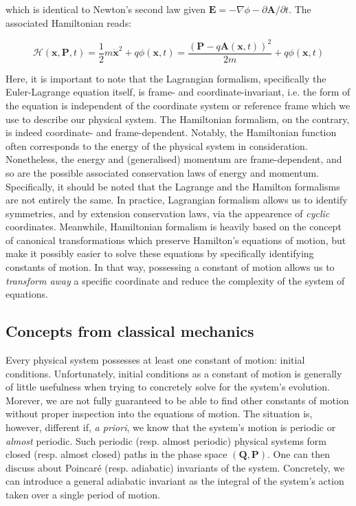which is identical to Newton's second law given $\mathbf{E}=-\nabla \phi-\partial \mathbf{A}/\partial t$. The associated Hamiltonian reads:

\begin{equation}
    \mathcal{H}(\mathbf{x},\mathbf{P},t)=\frac{1}{2}m\dot{\mathbf{x}}^2+q\phi(\mathbf{x},t)=\frac{\left(\mathbf{P}-q \mathbf{A}(\mathbf{x},t)\right)^2}{2m}+q\phi(\mathbf{x},t)
\end{equation}

Here, it is important to note that the Lagrangian formalism, specifically the Euler-Lagrange equation itself, is frame- and coordinate-invariant, i.e. the form of the equation is independent of the coordinate system or reference frame which we use to describe our physical system. The Hamiltonian formalism, on the contrary, is indeed coordinate- and frame-dependent. Notably, the Hamiltonian function often corresponds to the energy of the physical system in consideration. Nonetheless, the energy and (generalised) momentum are frame-dependent, and so are the possible associated conservation laws of energy and momentum. Specifically, it should be noted that the Lagrange and the Hamilton formalisms are not entirely the same. In practice, Lagrangian formalism allows us to identify symmetries, and by extension conservation laws, via the appearence of \textit{cyclic} coordinates. Meanwhile, Hamiltonian formalism is heavily based on the concept of canonical transformations which preserve Hamilton's equations of motion, but make it possibly easier to solve these equations by specifically identifying constants of motion. In that way, possessing a constant of motion allows us to \textit{transform away} a specific coordinate and reduce the complexity of the system of equations.

\subsection{Concepts from classical mechanics}

Every physical system possesses at least one constant of motion: initial conditions. Unfortunately, initial conditions as a constant of motion is generally of little usefulness when trying to concretely solve for the system's evolution. Morever, we are not fully guaranteed to be able to find other constants of motion without proper inspection into the equations of motion. The situation is, however, different if, \textit{a priori}, we know that the system's motion is periodic or \textit{almost} periodic. Such periodic (resp. almost periodic) physical systems form closed (resp. almost closed) paths in the phase space $(\mathbf{Q}, \mathbf{P})$. One can then discuss about Poincaré (resp. adiabatic) invariants of the system. Concretely, we can introduce a general adiabatic invariant as the integral of the system's action taken over a single period of motion.

